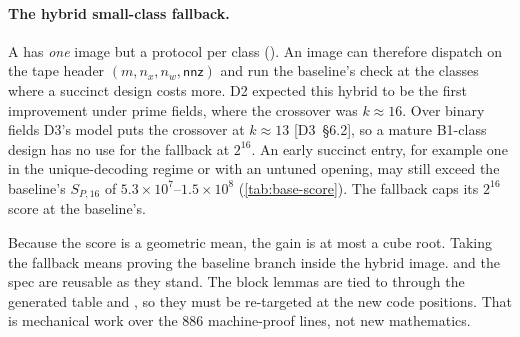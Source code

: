 \paragraph{The hybrid small-class fallback.} A  has \emph{one} image but a protocol
per class (). An image can therefore dispatch on
the tape header $(m,n_x,n_w,\mathsf{nnz})$ and run the baseline's check at the classes where a
succinct design costs more. D2 expected this hybrid to be the first improvement under prime fields,
where the crossover was $k\approx16$. Over binary fields D3's model puts the crossover at $k\approx13$
[D3~§6.2], so a mature B1-class design has no use for the fallback at $2^{16}$. An early succinct
entry, for example one in the unique-decoding regime or with an untuned opening, may still exceed the
baseline's $S_{P,16}$ of $5.3\times10^7$--$1.5\times10^8$ (\cref{tab:base-score}). The fallback caps
its $2^{16}$ score at the baseline's.

Because the score is a geometric mean, the gain is at most a cube root. Taking the fallback means
proving the baseline branch inside the hybrid image.  and the spec are reusable as
they stand. The block lemmas are tied to  through the generated  table and
, so they must be re-targeted at the new code positions. That is mechanical work over
the 886 machine-proof lines, not new mathematics.
\endgroup
